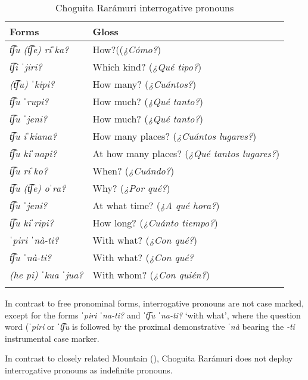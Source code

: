 \begin{table}
\begin{tabularx}{\textwidth}{lQ}
\lsptoprule
\textbf{Forms}  & \textbf{Gloss} \\
\midrule
\textit{t͡ʃu (t͡ʃe) riˈka?} & How?((\textit{¿Cómo?})\\
\textit{t͡ʃi ˈjiri?} & Which kind? (\textit{¿Qué tipo?})\\
\textit{(t͡ʃu) ˈkipi?} & How many? (\textit{¿Cuántos?})\\
\textit{t͡ʃu ˈrupi?} & How much? (\textit{¿Qué tanto?})\\
\textit{t͡ʃu ˈjeni?} & How much? (\textit{¿Qué tanto?})\\
\textit{t͡ʃu iˈkiana?} & How many places? (\textit{¿Cuántos lugares?})\\
\textit{t͡ʃu kiˈnapi?} & At how many places? (\textit{¿Qué tantos lugares?})\\
\textit{t͡ʃu riˈko?}  & When? (\textit{¿Cuándo?})\\
\textit{t͡ʃu (t͡ʃe) oˈra?} & Why? (\textit{¿Por qué?})\\
\textit{t͡ʃu ˈjeni?} & At what time? (\textit{¿A qué hora?})\\
\textit{t͡ʃu kiˈripi?} & How long? (\textit{¿Cuánto tiempo?})\\
\textit{ˈpiri ˈnà-ti?} & With what? (\textit{¿Con qué?})\\
\textit{t͡ʃu ˈnà-ti?} & With what? (\textit{¿Con qué?}\\
\textit{(he pi) ˈkua ˈjua?} & With whom? (\textit{¿Con quién?})\\
\lspbottomrule
\end{tabularx}
\caption{Choguita Rarámuri interrogative pronouns}
\label{tab:21:2}
\end{table}

In contrast to free pronominal forms, interrogative pronouns are not case marked, except for the forms \textit{ˈpiri ˈna-ti?} and \textit{ˈt͡ʃu ˈna-ti?} `with what', where the question word (\textit{ˈpiri} or \textit{ˈt͡ʃu} is followed by the proximal demonstrative \textit{ˈnà} bearing the \textit{-ti} instrumental case marker.

In contrast to closely related Mountain  (\citealt{miller1996guarijio}), Choguita Rarámuri does not deploy interrogative pronouns as indefinite pronouns.


